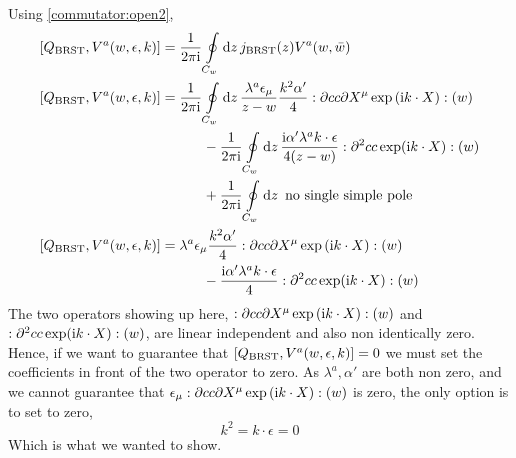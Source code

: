 Using \cref{commutator:open2},
\begin{align*}
    \comm{Q_{\textnormal{BRST}}}{V^a\qty(w,\epsilon,k)}&=\frac{1}{2\pi\im}\oint\limits_{C_w}\dd{z}j_{\textnormal{BRST}}\qty(z)V^a\qty(w,\bar w)\\
    \comm{Q_{\textnormal{BRST}}}{V^a\qty(w,\epsilon,k)}&=\frac{1}{2\pi\im}\oint\limits_{C_w}\dd{z}\frac{\lambda^a\epsilon_\mu}{z-w}\frac{k^2\alpha'}{4}\cnord{\partial cc\partial X^\mu\exp\qty(\im k\cdot X)}\qty(w)\\
    &\quad\quad\quad-\frac{1}{2\pi\im}\oint\limits_{C_w}\dd{z}\frac{\im\alpha'\lambda^ak\cdot\epsilon}{4\qty(z-w)}\cnord{\partial^2 cc\exp(\im k\cdot X)}\qty(w)\\
    &\quad\quad\quad+\frac{1}{2\pi\im}\oint\limits_{C_w}\dd{z} \textnormal{ no single simple pole}\\
    \comm{Q_{\textnormal{BRST}}}{V^a\qty(w,\epsilon,k)}&=\lambda^a\epsilon_\mu\frac{k^2\alpha'}{4}\cnord{\partial cc\partial X^\mu\exp\qty(\im k\cdot X)}\qty(w)\\
    &\quad\quad\quad-\frac{\im\alpha'\lambda^ak\cdot\epsilon}{4}\cnord{\partial^2 cc\exp(\im k\cdot X)}\qty(w)\\
\end{align*}
The two operators showing up here, $:\partial cc\partial X^\mu\exp\qty(\textnormal{i} k\cdot X):\qty(w)$ and $:\partial^2 cc\exp(\textnormal{i} k\cdot X):\qty(w)$, 
are linear independent and also non identically zero. Hence, if we want to guarantee that $\comm{Q_{\textnormal{BRST}}}{V^a\qty(w,\epsilon,k)}=0$ 
we must set the coefficients in front of the two operator to zero. As $\lambda^a,\alpha'$ are both non zero, and we cannot guarantee that 
$\epsilon_\mu :\partial cc\partial X^\mu\exp\qty(\textnormal{i} k\cdot X):\qty(w)$ is zero, the only option is to set to zero,
\[k^2=k\cdot \epsilon=0\]
Which is what we wanted to show.



